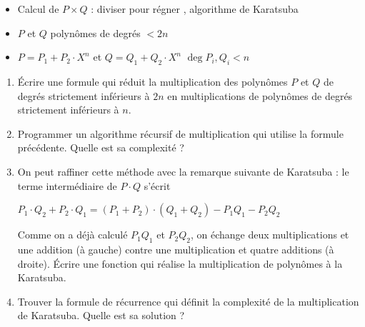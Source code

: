 \begin{frame}


\begin{itemize}
\item Calcul de $P\times Q$ \pause : \og diviser pour régner \fg, \pause algorithme de Karatsuba
\pause
  \item $P$ et $Q$ polynômes de degrés $< 2n$
\pause  
  

  \item $P = P_1 + P_2 \cdot X^n$ et $Q = Q_1 + Q_2 \cdot X^n$ \pause \quad $\deg P_i, Q_i < n$
\end{itemize}

\pause
\vspace*{-1ex}
\begin{tp}
\small\vspace*{-1ex}
\begin{enumerate}
\setlength{\itemsep}{0pt}
  \item \'Ecrire une formule qui réduit la multiplication des polynômes $P$ et $Q$ de degrés strictement inférieurs à $2n$ en
multiplications de polynômes de degrés strictement inférieurs à $n$.

  \item Programmer un algorithme récursif de multiplication qui utilise la formule précédente. Quelle est sa complexité ?
  
  \item On peut raffiner cette méthode avec la remarque suivante de Karatsuba : le terme intermédiaire de $P \cdot Q$ s’écrit
\centerline{$P_1 \cdot Q_2 + P_2 \cdot Q_1 = (P_1 + P_2 ) \cdot (Q_1 + Q_2 ) - P_1 Q_1 - P_2 Q_2$}
Comme on a déjà calculé $P_1Q_1$ et $P_2Q_2$, on échange deux multiplications et une addition (à gauche) 
contre une multiplication et quatre additions (à droite).
\'Ecrire une fonction qui réalise la multiplication de polynômes à la Karatsuba.
  
  \item Trouver la formule de récurrence qui définit la complexité de la multiplication de Karatsuba. Quelle est sa solution ?
\end{enumerate}
\vspace*{-2.5ex}
\end{tp}
\end{frame}


